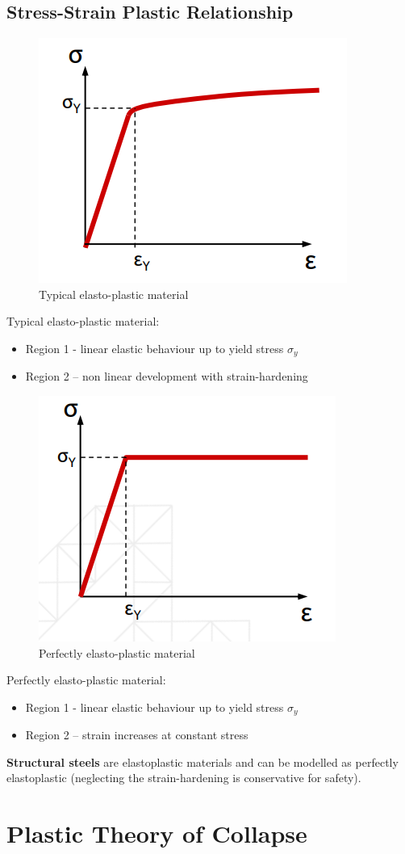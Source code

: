 \documentclass[class=report, crop=false, 12pt,a4paper]{standalone}
\begin{document}
\subsection{Stress-Strain Plastic Relationship}
\begin{figure}[H]
  \centering
  \includegraphics[width = 0.4 \textwidth]{../img/graph4.PNG}
  \caption{Typical elasto-plastic material}
\end{figure}
Typical elasto-plastic material:
\begin{itemize}
  \item Region 1 - linear elastic behaviour up to yield stress $\sigma_y$
  \item Region 2 – non linear development with strain-hardening
\end{itemize}
\begin{figure}[H]
  \centering
  \includegraphics[width = 0.4 \textwidth]{../img/graph5.PNG}
  \caption{Perfectly elasto-plastic material}
\end{figure}
Perfectly elasto-plastic material:
\begin{itemize}
  \item Region 1 - linear elastic behaviour up to yield stress $\sigma_y$
  \item Region 2 – strain increases at constant stress
\end{itemize}
\textbf{Structural steels} are elastoplastic materials and can be modelled as perfectly elastoplastic (neglecting the strain-hardening is conservative for safety).
\section{Plastic Theory of Collapse}
\end{document}
